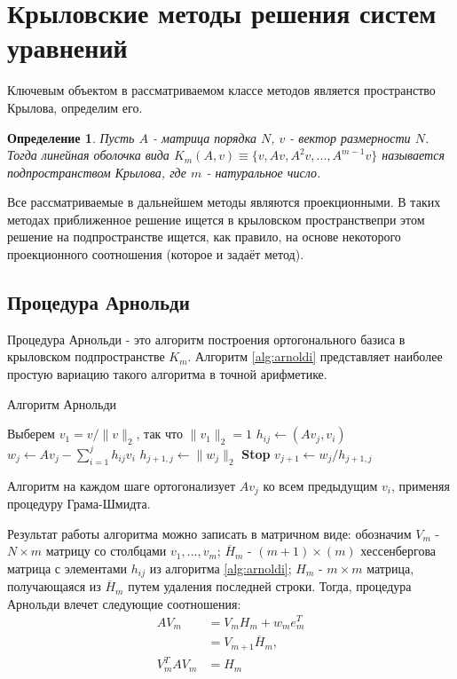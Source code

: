 \section{Крыловские методы решения систем уравнений}
\label{sec:Chapter2} 
Ключевым объектом в рассматриваемом классе методов является пространство Крылова, определим его.
\newtheorem{definition}{Определение}
\begin{definition}
    Пусть $A$ - матрица порядка $N$, $v$ - вектор размерности $N$. Тогда линейная
    оболочка вида $K_m\left(A,v\right) \equiv \{v,Av,A^2v,...,A^{m-1}v\} $ называется 
    подпространством Крылова, где $m$ - натуральное число. 
\end{definition}
Все рассматриваемые в дальнейшем методы являются проекционными.
В таких методах приближенное решение ищется в крыловском пространствепри этом 
решение на подпространстве ищется, как правило, на основе некоторого проекционного
 соотношения (которое и задаёт метод).
\subsection[Процедура Арнольди]{Процедура Арнольди \cite{Saad2003}}
Процедура Арнольди - это алгоритм построения ортогонального базиса в крыловском
подпространстве $K_m$. Алгоритм \ref{alg:arnoldi} представляет наиболее простую
вариацию такого алгоритма в точной арифметике.
\begin{algorithm}[H]
    \caption{Алгоритм Арнольди}\label{alg:arnoldi}
    \begin{algorithmic}[1]
    \State Выберем $v_1 = v / \|v\|_2$, так что $\|v_1\|_2 = 1$
    \Statex
            \State $h_{ij} \gets (Av_j, v_i)$
        \EndFor
        \State $w_j \gets Av_j - \sum_{i=1}^j h_{ij}v_i$
        \State $h_{j+1,j} \gets \|w_j\|_2$
            \State \textbf{Stop}
        \EndIf
        \State $v_{j+1} \gets w_j/h_{j+1,j}$
    \EndFor
    \end{algorithmic}
\end{algorithm}
Алгоритм на каждом шаге ортогонализует $Av_j$ ко всем предыдущим $v_i$, 
применяя процедуру Грама-Шмидта. 
\par Результат работы алгоритма можно записать в матричном
виде: обозначим $V_m$ - $N \times m$ матрицу со столбцами $v_1,...,v_m$; 
$\overline{H}_m$ - $\left(m+1\right) \times \left( m \right)$  хессенбергова матрица с 
элементами $h_{ij}$ из алгоритма \ref{alg:arnoldi}; ${H}_m$ - $ m \times m $ матрица, 
получающаяся из $\overline{H}_m$ путем удаления последней строки. Тогда, процедура Арнольди
влечет следующие соотношения:
\begin{align}
    AV_m &= V_m H_m + w_m e_m^T \\
         &= V_{m+1} \overline{H}_m,\\
    V_m^T A V_m &= H_m \label{eq:VAVHM}
\end{align} 
